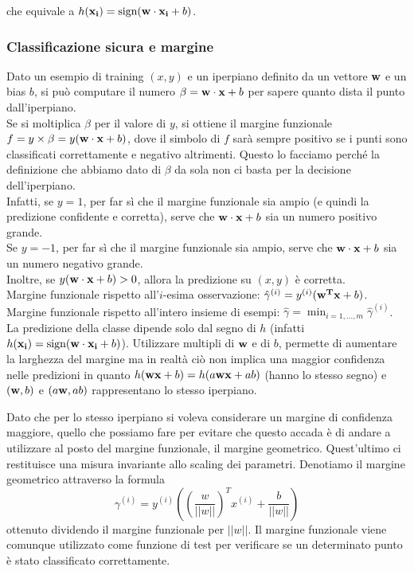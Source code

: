 che equivale a $h(\bold{x_i}) = \text{sign}(\bold{w} \cdot \bold{x_i} + b)$.\\
\subsubsection{Classificazione sicura e margine}
Dato un esempio di training $(x,y)$ e un iperpiano definito da un vettore $\bold{w}$ e un bias $b$, si può computare il numero $\beta = \bold{w} \cdot \bold{x} + b$ per sapere quanto dista il punto dall’iperpiano.\\
Se si moltiplica $\beta$ per il valore di $y$, si ottiene il margine funzionale $f = y \times \beta = y (\bold{w} \cdot \bold{x} + b)$, dove il simbolo di $f$ sarà sempre positivo se i punti sono classificati correttamente e negativo altrimenti. Questo lo facciamo perché la definizione che abbiamo dato di $\beta$ da sola non ci basta per la decisione dell'iperpiano.\\
Infatti, se $y = 1$, per far sì che il margine funzionale sia ampio (e quindi la predizione confidente e corretta), serve che $\bold{w} \cdot \bold{x} + b$ sia un numero positivo grande.\\
Se $y = -1$, per far sì che il margine funzionale sia ampio, serve che $\bold{w} \cdot \bold{x} + b$ sia un numero negativo grande. \\
Inoltre, se $y (\bold{w} \cdot \bold{x} + b) > 0$, allora la predizione su $(x,y)$ è corretta.\\

Margine funzionale rispetto all’$i$-esima osservazione: $\hat \gamma^{(i)} = y^{(i)}(\bold{w^T x} + b)$.\\
Margine funzionale rispetto all’intero insieme di esempi: $\displaystyle \hat \gamma = \operatorname*{min}_{i = 1, \dots, m}\hat \gamma^{(i)}$.\\

La predizione della classe dipende solo dal segno di $h$ (infatti $h(\bold{x_i}) = \text{sign}(\bold{w} \cdot \bold{x_i} + b)$).
Utilizzare multipli di $\bold{w}$ e di $b$, permette di aumentare la larghezza del margine ma in realtà ciò non implica una maggior confidenza nelle predizioni in quanto $h(\bold{wx} + b) = h(a \bold{wx} + ab)$ (hanno lo stesso segno) e $(\bold{w}, b)$ e $(a\bold{w}, ab)$ rappresentano lo stesso iperpiano.

Dato che per lo stesso iperpiano si voleva considerare un margine di confidenza maggiore, quello che possiamo fare per evitare che questo accada è di andare a utilizzare al posto del margine funzionale, il margine geometrico. Quest'ultimo ci restituisce una misura invariante allo scaling dei parametri.
Denotiamo il margine geometrico attraverso la formula \[\gamma^{(i)} = y^{(i)} \left(\left(\displaystyle \frac{w}{||w||}\right)^T x^{(i)} + \frac{b}{||w||}\right)\]
ottenuto dividendo il margine funzionale per $||w||$.
Il margine funzionale viene comunque utilizzato come funzione di test per verificare se un determinato punto è stato classificato correttamente.\\

